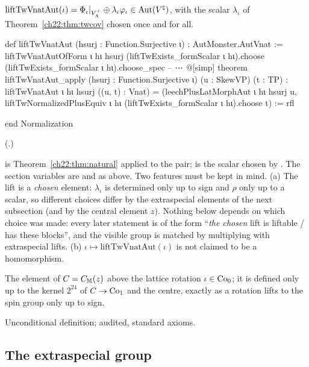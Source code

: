 \begin{definition}\label{ch22:def:liftTw}
$\mathrm{liftTwVnatAut}(\iota)=\Phi_\iota|_{V_{\Lambda}^+}\oplus \lambda_\iota\varphi_\iota\in\operatorname{Aut}({V^{\natural}})$, with the scalar $\lambda_\iota$ of
Theorem~\ref{ch22:thm:twcov} chosen once and for all.
\end{definition}
\begin{leancode}
def liftTwVnatAut (hsurj : Function.Surjective ι) : AutMonster.AutVnat :=
  liftTwVnatAutOfForm ι hι hsurj (liftTwExists_formScalar ι hι).choose
    (liftTwExists_formScalar ι hι).choose_spec
-- ⋯
@[simp] theorem liftTwVnatAut_apply (hsurj : Function.Surjective ι)
    (u : SkewVP) (t : TP) :
    liftTwVnatAut ι hι hsurj ((u, t) : Vnat) =
      (leechPlusLatMorphAut ι hι hsurj u,
        liftTwNormalizedPlusEquiv ι hι (liftTwExists_formScalar ι hι).choose t) := rfl

end Normalization
\end{leancode}
(.)
\begin{dictionary}
 is Theorem~\ref{ch22:thm:natural} applied to the pair;  is the scalar
chosen by .  The section variables are  and  as above.  Two features must be
kept in mind.  (a) The lift is a \emph{chosen} element: $\lambda_\iota$ is determined only up to sign and $\rho$ only up to a
scalar, so different choices differ by the extraspecial elements of the next subsection (and by the central element
$z$).  Nothing below depends on which choice was made: every later statement is of the form ``\emph{the chosen} lift
is liftable / has these blocks'', and the visible group is matched by multiplying with extraspecial lifts.  (b)
$\iota\mapsto\mathrm{liftTwVnatAut}(\iota)$ is not claimed to be a homomorphism.
\end{dictionary}
\begin{physics}
The element of $C=C_{\mathbb{M}}(z)$ above the lattice rotation $\iota\in\mathrm{Co}_0$; it is defined only up to the
kernel $2^{24}$ of $C\to\mathrm{Co}_1$ and the centre, exactly as a rotation lifts to the spin group only up to sign.
\end{physics}
\begin{status}Unconditional definition;  audited, standard axioms.\end{status}


\subsection{The extraspecial group}

